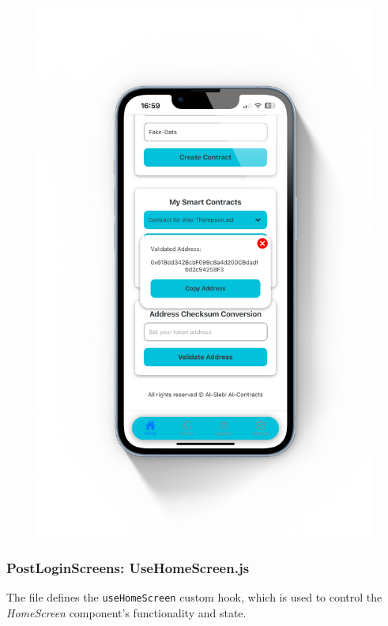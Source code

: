 \begin{figure}[!ht]
\begin{minipage}{0.5\textwidth}
        \includegraphics[scale=0.08]{LATEX/Appendices/Images/Software/Frontend/home_screen_4.png}
        \label{fig:home screen 4}
    \end{minipage}
\end{figure}

\newpage
\subsubsection{PostLoginScreens: UseHomeScreen.js}

The file defines the \texttt{useHomeScreen} custom hook, which is used to control the \textit{HomeScreen} component's functionality and state.

